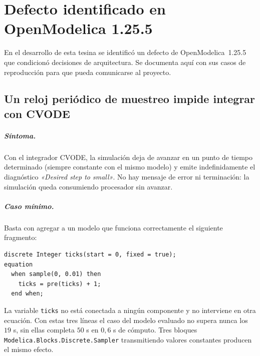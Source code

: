 \chapter{Defecto identificado en OpenModelica 1.25.5}
\label{sec:defectos}

En el desarrollo de esta tesina se identificó un defecto de OpenModelica~1.25.5 que condicionó decisiones de arquitectura. Se documenta aquí con sus casos de reproducción para que pueda comunicarse al proyecto.


\section{Un reloj periódico de muestreo impide integrar con CVODE}
\label{sec:defecto-reloj}



\paragraph{Síntoma.} Con el integrador CVODE, la simulación deja de avanzar en un punto de tiempo determinado (siempre constante con el mismo modelo) y emite indefinidamente el diagnóstico \textit{«Desired step to small»}. No hay mensaje de error ni terminación: la simulación queda consumiendo procesador sin avanzar.

\paragraph{Caso mínimo.} Basta con agregar a un modelo que funciona correctamente el siguiente fragmento:

\begin{verbatim}
discrete Integer ticks(start = 0, fixed = true);
equation
  when sample(0, 0.01) then
    ticks = pre(ticks) + 1;
  end when;
\end{verbatim}

La variable \verb|ticks| no está conectada a ningún componente y no interviene en otra ecuación. Con estas tres líneas el caso del modelo evaluado no supera nunca los  $19$ s, sin ellas completa $50$ s en $0{,}6$ s de cómputo. Tres bloques \verb|Modelica.Blocks.Discrete.Sampler| transmitiendo valores constantes producen el mismo efecto.

